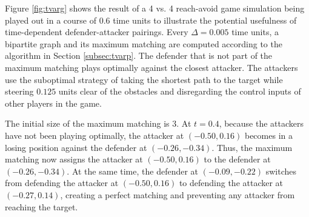 Figure \ref{fig:tvarg} shows the result of a 4 vs. 4 reach-avoid game simulation being played out in a course of 0.6 time units to illustrate the potential usefulness of time-dependent defender-attacker pairings. Every $\Delta=0.005$ time units, a bipartite graph and its maximum matching are computed according to the algorithm in Section \ref{subsec:tvarp}. The defender that is not part of the maximum matching plays optimally against the closest attacker. The attackers use the suboptimal strategy of taking the shortest path to the target while steering $0.125$ units clear of the obstacles and disregarding the control inputs of other players in the game.

The initial size of the maximum matching is 3. At $t=0.4$, because the attackers have not been playing optimally, the attacker at $(-0.50,0.16)$ becomes in a losing position against the defender at $(-0.26, -0.34)$. Thus, the maximum matching now assigns the attacker at $(-0.50,0.16)$ to the defender at $(-0.26, -0.34)$. At the same time, the defender at $(-0.09, -0.22)$ switches from defending the attacker at $(-0.50,0.16)$ to defending the attacker at $(-0.27,0.14)$, creating a perfect matching and preventing any attacker from reaching the target.

